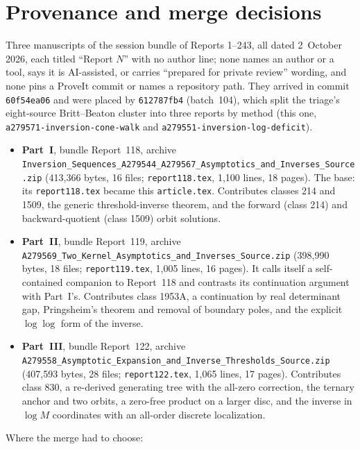 \documentclass[11pt,letterpaper]{article}
\theoremstyle{remark}\newtheorem{remark}[theorem]{Remark}
\newcommand{\file}[1]{\nolinkurl{#1}}
\begin{document}
\section*{Provenance and merge decisions}\label{ivk:sec:provenance}
Three manuscripts of the session bundle of Reports 1--243, all dated 2~October 2026, each titled ``Report $N$'' with no author line; none names an author or a tool, says it is AI-assisted, or carries ``prepared for private review'' wording, and none pins a ProveIt commit or names a repository path. They arrived in commit \texttt{60f54ea06} and were placed by \texttt{612787fb4} (batch~104), which split the triage's eight-source Britt--Beaton cluster into three reports by method (this one, \file{a279571-inversion-cone-walk} and \file{a279551-inversion-log-deficit}).
\begin{itemize}
\item \textbf{Part~I}, bundle Report~118, archive \file{Inversion_Sequences_A279544_A279567_Asymptotics_and_Inverses_Source.zip} (413{,}366 bytes, 16 files; \file{report118.tex}, 1{,}100 lines, 18 pages). The base: its \file{report118.tex} became this \file{article.tex}. Contributes classes 214 and 1509, the generic threshold-inverse theorem, and the forward (class 214) and backward-quotient (class 1509) orbit solutions.
\item \textbf{Part~II}, bundle Report~119, archive \file{A279569_Two_Kernel_Asymptotics_and_Inverses_Source.zip} (398{,}990 bytes, 18 files; \file{report119.tex}, 1{,}005 lines, 16 pages). It calls itself a self-contained companion to Report~118 and contrasts its continuation argument with Part~I's. Contributes class 1953A, a continuation by real determinant gap, Pringsheim's theorem and removal of boundary poles, and the explicit $\log\log$ form of the inverse.
\item \textbf{Part~III}, bundle Report~122, archive \file{A279558_Asymptotic_Expansion_and_Inverse_Thresholds_Source.zip} (407{,}593 bytes, 28 files; \file{report122.tex}, 1{,}065 lines, 17 pages). Contributes class 830, a re-derived generating tree with the all-zero correction, the ternary anchor and two orbits, a zero-free product on a larger disc, and the inverse in $\log M$ coordinates with an all-order discrete localization.
\end{itemize}
Where the merge had to choose:
\end{document}
